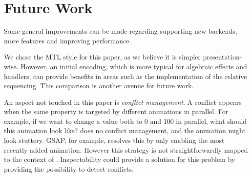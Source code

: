 \section{Future Work}
\label{sec:future}

Some general improvements can be made regarding supporting new backends, more features and improving performance.

We chose the MTL style for this paper, as we believe it is simpler presentation-wise. However, an initial encoding, which is more typical for algebraic effects and handlers, can provide benefits in areas such as the implementation of the relative sequencing. This comparison is another avenue for future work.

An aspect not touched in this paper is \emph{conflict management}. A conflict appears when the same property is targeted by different animations in parallel. For example, if we want to change a value both to 0 and 100 in parallel, what should this animation look like? \dsl{} does no conflict management, and the animation might look stuttery. GSAP, for example, resolves this by only enabling the most recently added animation. However this strategy is not straightforwardly mapped to the context of \dsl{}. Inspectability could provide a solution for this problem by providing the possibility to detect conflicts.
